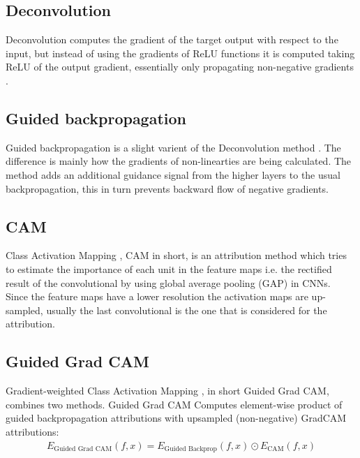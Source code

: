 \documentclass[12pt]{report}
\begin{document}
\subsection{Deconvolution}

Deconvolution \cite{DBLP:journals/corr/ZeilerF13} computes the gradient of the target output with respect to the input, but instead of using the gradients of ReLU functions it is computed taking ReLU of the output gradient, essentially only propagating non-negative gradients \cite{10.1007/978-3-319-46466-4_8}.


\subsection{Guided backpropagation}

Guided backpropagation is a slight varient of the Deconvolution method \cite{https://doi.org/10.48550/arxiv.1412.6806}. The difference is mainly how the gradients of non-linearties are  being calculated. The method adds an additional guidance signal from the higher layers to the usual backpropagation, this in turn prevents backward flow of negative gradients.

\subsection{CAM}

Class Activation Mapping \cite{DBLP:journals/corr/ZhouKLOT15}, CAM in short, is an attribution method which tries to estimate the importance of each unit in the feature maps i.e. the rectified result of the convolutional by using global average pooling (GAP) in CNNs.\\

Since the feature maps have a lower resolution the activation maps are up-sampled, usually the last convolutional is the one that is considered for the attribution.

\subsection{Guided Grad CAM}

Gradient-weighted Class Activation Mapping \cite{DBLP:journals/corr/SelvarajuDVCPB16}, in short Guided Grad CAM, combines two methods.
Guided Grad CAM Computes element-wise product of guided backpropagation attributions with upsampled (non-negative) GradCAM attributions:
\begin{align*}
	E_\text{Guided Grad CAM}(f, x)  = E_\text{Guided Backprop}(f, x) \odot E_\text{CAM}(f, x)
\end{align*}
\end{document}
